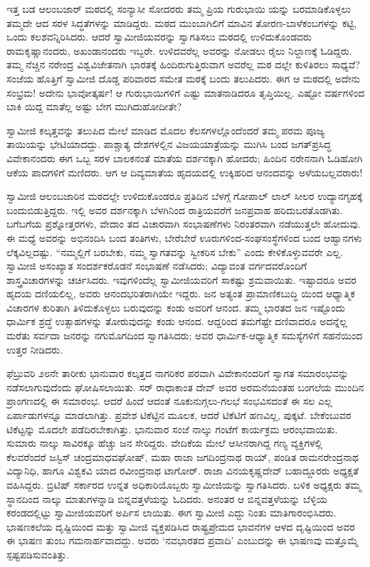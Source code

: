 ಇತ್ತ ಬಡ ಆಲಂಬಜಾರ್ ಮಠದಲ್ಲಿ ಸಂನ್ಯಾಸೀ ಸೋದರರು ತಮ್ಮ ಪ್ರಿಯ ಗುರುಭಾಯಿ ಯನ್ನು ಬರಮಾಡಿಕೊಳ್ಳಲು ತಮ್ಮದೇ ಆದ ಸರಳ ಸಿದ್ಧತೆಗಳನ್ನು ಮಾಡಿದ್ದರು. ಮಠದ ಮುಂಬಾಗಿಲಿಗೆ ಮಾವಿನ ತೋರಣ-ಬಾಳೆಕಂಬಗಳನ್ನು ಕಟ್ಟಿ, ಒಂದು ಕಲಶವನ್ನಿರಿಸಿದರು. ಆದರೆ ಸ್ವಾಮೀಜಿಯವರನ್ನು ಸ್ವಾಗತಿಸಲು ಮಠದಲ್ಲಿ ಉಳಿದುಕೊಂಡವರು ರಾಮಕೃಷ್ಣಾನಂದರು, ಅಖಂಡಾನಂದರು ಇಬ್ಬರೇ. ಉಳಿದವರೆಲ್ಲ ಅವರನ್ನು ನೋಡಲು ರೈಲು ನಿಲ್ದಾಣಕ್ಕೆ ಓಡಿದ್ದರು. ತಮ್ಮ ನೆಚ್ಚಿನ ನರೇಂದ್ರ ವಿಶ್ವವಿಜೇತನಾಗಿ ಭಾರತಕ್ಕೆ ಹಿಂದಿರುಗುತ್ತಿರುವಾಗ ಅವರೆಲ್ಲ ಮಠ ದಲ್ಲೇ ಕುಳಿತಿರಲು ಸಾಧ್ಯವೆ? ಸಂಜೆಯ ಹೊತ್ತಿಗೆ ಸ್ವಾಮೀಜಿ ದೊಡ್ಡ ಪರಿವಾರದ ಸಮೇತ ಮಠಕ್ಕೆ ಬಂದು ತಲುಪಿದರು. ಈಗ ಆ ಮಠದಲ್ಲಿ ಅದೇನು ಸಂಭ್ರಮ! ಅದೇನು ಭಾವೋತ್ಕರ್ಷ! ಆ ಗುರುಭಾಯಿಗಳಿಗೆ ಎಷ್ಟು ಮಾತನಾಡಿದರೂ ತೃಪ್ತಿಯಿಲ್ಲ. ಎಷ್ಟೋ ವರ್ಷಗಳಿಂದ ಬಾಕಿ ಯಿದ್ದ ಮಾತೆಲ್ಲ ಅಷ್ಟು ಬೇಗ ಮುಗಿದುಹೋದೀತೇ?

ಸ್ವಾಮೀಜಿ ಕಲ್ಕತ್ತವನ್ನು ತಲುಪಿದ ಮೇಲೆ ಮಾಡಿದ ಮೊದಲ ಕೆಲಸಗಳಲ್ಲೊಂದೆಂದರೆ ತಮ್ಮ ಪರಮ ಪೂಜ್ಯ ತಾಯಿಯನ್ನು ಭೇಟಿಯಾದದ್ದು. ಪಾಶ್ಚಾತ್ಯ ದೇಶಗಳಲ್ಲಿನ ವಿಜಯಯಾತ್ರೆಯನ್ನು ಮುಗಿಸಿ ಬಂದ ಜಗತ್​ಪ್ರಸಿದ್ಧ ವಿವೇಕಾನಂದರು ಈಗ ಒಬ್ಬ ಸರಳ ಬಾಲಕನಂತೆ ಮಾತೆಯ ದರ್ಶನಕ್ಕಾಗಿ ಹೋದರು; ಹಿಂದಿನ ನರೇನನಾಗಿ ಓಡಿಹೋಗಿ ಆಕೆಯ ಪಾದಗಳಿಗೆ ಮಣಿದರು. ಆಗ ಆ ದಿವ್ಯಮಾತೆಯ ಹೃದಯದಲ್ಲಿ ಉಕ್ಕಿಹರಿದ ಆನಂದವನ್ನು ಅಳೆಯಬಲ್ಲವರಾರು!

ಸ್ವಾಮೀಜಿ ಆಲಂಬಜಾರಿನ ಮಠದಲ್ಲೇ ಉಳಿದುಕೊಂಡರೂ ಪ್ರತಿದಿನ ಬೆಳಗ್ಗೆ ಗೋಪಾಲ್ ಲಾಲ್ ಸೀಲರ ಉದ್ಯಾನಗೃಹಕ್ಕೆ ಬಂದುಬಿಡುತ್ತಿದ್ದರು. ಇಲ್ಲಿ ಅವರ ದರ್ಶನಕ್ಕಾಗಿ ಬೆಳಗಿನಿಂದ ರಾತ್ರಿಯವರೆಗೆ ಜನಪ್ರವಾಹ ಹರಿದುಬರತೊಡಗಿತು. ಬಗೆಬಗೆಯ ಪ್ರಶ್ನೋತ್ತರಗಳು, ವೇದಾಂ ತದ ವಿಚಾರವಾಗಿ ಸಂಭಾಷಣೆಗಳು ನಿರಂತರವಾಗಿ ನಡೆಯುತ್ತಲೇ ಹೋದುವು. ಈ ಮಧ್ಯೆ ಅವರನ್ನು ಅಭಿನಂದಿಸಿ ಬಂದ ತಂತಿಗಳು, ಬೇರೆಬೇರೆ ಊರುಗಳಿಂದ-ಸಂಘಸಂಸ್ಥೆಗಳಿಂದ ಬಂದ ಆಹ್ವಾನಗಳು ಲೆಕ್ಕವಿಲ್ಲದಷ್ಟು. “ನಮ್ಮಲ್ಲಿಗೆ ಬರಬೇಕು, ನಮ್ಮ ಸ್ವಾಗತವನ್ನು ಸ್ವೀಕರಿಸ ಬೇಕು” ಎಂದು ಕೇಳಿಕೊಳ್ಳುವವರೇ ಎಲ್ಲ. ಸ್ವಾಮೀಜಿ ಅಸಂಖ್ಯಾತ ಸಂದರ್ಶಕರೊಡನೆ ಸಂಭಾಷಣೆ ನಡೆಸಿದರು; ವಿದ್ಯಾವಂತ ವರ್ಗದವರೊಂದಿಗೆ ಶಾಸ್ತ್ರವಿಚಾರಗಳನ್ನು ಚರ್ಚಿಸಿದರು. ಇವುಗಳಿಂದೆಲ್ಲ ಸ್ವಾಮೀಜಿಯವರಿಗೆ ಸಾಕಷ್ಟು ಶ್ರಮವಾಯಿತು. ಇಷ್ಟಾದರೂ ಅವರ ಹೃದಯ ದಣಿಯಲಿಲ್ಲ, ಅವರು ಆನಂದಭರಿತರಾಗಿಯೇ ಇದ್ದರು. ಜನ ಅತ್ಯಂತ ಪ್ರಾಮಾಣಿಕಬುದ್ಧಿ ಯಿಂದ ಆಧ್ಯಾತ್ಮಿಕ ವಿಚಾರಗಳ ಕುರಿತಾಗಿ ತಿಳಿದುಕೊಳ್ಳಲು ಬರುವುದನ್ನು ಕಂಡು ಅವರಿಗೆ ಆನಂದ. ತಮ್ಮ ಭಾರತದ ಜನ ಇಷ್ಟೊಂದು ಧಾರ್ಮಿಕ ಶ್ರದ್ಧೆ ಉತ್ಸಾಹಗಳನ್ನು ತೋರುವುದನ್ನು ಕಂಡು ಆನಂದ. ಆದ್ದರಿಂದ ತಮಗೆಷ್ಟೇ ದಣಿವಾದರೂ ಅದನ್ನೆಲ್ಲ ಮರೆತು ಸರ್ವದಾ ಜನರನ್ನು ನಗುಮೊಗದಿಂದ ಸ್ವಾಗತಿಸಿದರು; ಅವರ ಧಾರ್ಮಿಕ-ಆಧ್ಯಾತ್ಮಿಕ ಸಮಸ್ಯೆಗಳಿಗೆ ಸಹನೆಯಿಂದ ಉತ್ತರ ನೀಡಿದರು.

ಫೆಬ್ರುವರಿ ೨೮ನೇ ತಾರೀಕು ಭಾನುವಾರ ಕಲ್ಕತ್ತದ ನಾಗರಿಕರ ಪರವಾಗಿ ವಿವೇಕಾನಂದರಿಗೆ ಸ್ವಾಗತ ಸಮಾರಂಭವನ್ನು ನಡೆಸಲಾಗುವುದೆಂದು ಘೋಷಿಸಲಾಯಿತು. ಸರ್ ರಾಧಾಕಾಂತ ದೇವ್ ಅವರ ಅರಮನೆಯಂತಹ ಬಂಗಲೆಯ ಮುಂದಿನ ಪ್ರಾಂಗಣದಲ್ಲಿ ಈ ಸಮಾರಂಭ. ಆದರೆ ಹಿಂದೆ ಆದಂತೆ ನೂಕುನುಗ್ಗಲು-ಗಲಭೆ ಸಂಭವಿಸದಂತೆ ಈ ಸಲ ಎಲ್ಲ ಏರ್ಪಾಡುಗಳನ್ನೂ ಮಾಡಲಾಗಿತ್ತು. ಪ್ರವೇಶ ಟಿಕೆಟ್ಟಿನ ಮೂಲಕ, ಆದರೆ ಟಿಕೆಟಿಗೆ ಹಣವಿಲ್ಲ, ಪುಕ್ಕಟೆ. ಬೇಕೆಂಬುವರ ಟಿಕೆಟ್ಟನ್ನು ಮೊದಲೇ ಪಡೆದಿರಬೇಕಾಗಿತ್ತು. ಭಾನುವಾರ ಸಂಜೆ ನಾಲ್ಕು ಗಂಟೆಗೆ ಕಾರ್ಯಕ್ರಮ ಆರಂಭವಾಯಿತು. ಸುಮಾರು ನಾಲ್ಕು ಸಾವಿರಕ್ಕೂ ಹೆಚ್ಚು ಜನ ಸೇರಿದ್ದರು. ವೇದಿಕೆಯ ಮೇಲೆ ಆಸೀನರಾಗಿದ್ದ ಗಣ್ಯ ವ್ಯಕ್ತಿಗಳಲ್ಲಿ ಕೆಲವರೆಂದರೆ ಜಸ್ಟಿಸ್ ಚಂದ್ರಮಾಧವಘೋಷ್, ಮಹಾ ರಾಜಾ ಜಗದಿಂದ್ರನಾಥ ರಾಯ್, ಪಂಡಿತ ರಾಮನರೇಂದ್ರನಾಥ ವಿದ್ಯಾನಿಧಿ, ಹಾಗೂ ವಿಶ್ವಕವಿ ಯಾದ ರವೀಂದ್ರನಾಥ ಟಾಗೋರ್. ರಾಜಾ ವಿನಯಕೃಷ್ಣದೇವ್ ಬಹಾದ್ದೂರರು ಅಧ್ಯಕ್ಷತೆ ವಹಿಸಿದ್ದರು. ಬ್ರಿಟಿಷ್ ಸರ್ಕಾರದ ಉನ್ನತ ಅಧಿಕಾರಿಯೊಬ್ಬರು ಸ್ವಾಮೀಜಿಯನ್ನು ಸ್ವಾಗತಿಸಿದರು. ಬಳಿಕ ಅಧ್ಯಕ್ಷರು ತಮ್ಮ ಸ್ಥಾನದಿಂದ ನಾಲ್ಕು ಮಾತುಗಳನ್ನಾಡಿ ಬಿನ್ನವತ್ತಳೆಯನ್ನು ಓದಿದರು. ಅನಂತರ ಆ ಬಿನ್ನವತ್ತಳೆಯನ್ನು ಬೆಳ್ಳಿಯ ಕರಂಡದಲ್ಲಿಟ್ಟು ಸ್ವಾಮೀಜಿಯವರಿಗೆ ಅರ್ಪಿಸ ಲಾಯಿತು. ಈಗ ಸ್ವಾಮೀಜಿ ಎದ್ದು ನಿಂತು ಮಾತಿಗಾರಂಭಿಸಿದರು. ಭಾಷಣಕಲೆಯ ದೃಷ್ಟಿಯಿಂದ ಮತ್ತು ಸ್ವಾಮೀಜಿ ವ್ಯಕ್ತಪಡಿಸಿದ ರಾಷ್ಟ್ರಪ್ರೇಮದ ಭಾವನೆಗಳ ಆಳದ ದೃಷ್ಟಿಯಿಂದ ಅವರ ಈ ಭಾಷಣ ತುಂಬ ಗಮನಾರ್ಹವಾದದ್ದು. ಅವರು ‘ನವಭಾರತದ ಪ್ರವಾದಿ’ ಎಂಬುದನ್ನು ಈ ಭಾಷಣವು ಮತ್ತೊಮ್ಮೆ ಸ್ಪಷ್ಟಪಡಿಸುವಂತಿತ್ತು.

